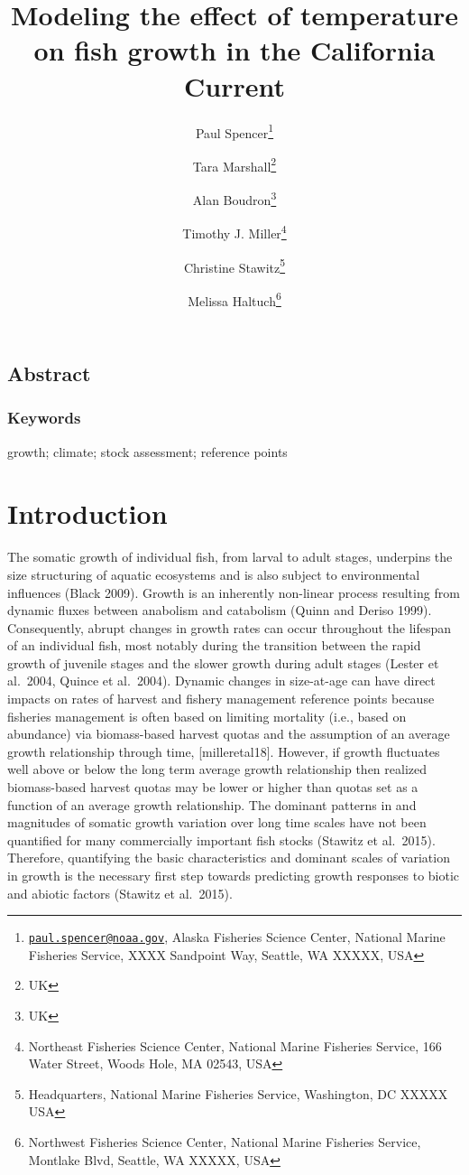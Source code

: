 \documentclass[]{article}
\title{Modeling the effect of temperature on fish growth in the California
Current}
\author{Paul Spencer\footnote{\href{mailto:paul.spencer@noaa.gov}{\nolinkurl{paul.spencer@noaa.gov}},
  Alaska Fisheries Science Center, National Marine Fisheries Service,
  XXXX Sandpoint Way, Seattle, WA XXXXX, USA} \and Tara Marshall\footnote{UK} \and Alan Boudron\footnote{UK} \and Timothy J. Miller\footnote{Northeast Fisheries Science Center, National
  Marine Fisheries Service, 166 Water Street, Woods Hole, MA 02543, USA} \and Christine Stawitz\footnote{Headquarters, National Marine Fisheries
  Service, Washington, DC XXXXX USA} \and Melissa Haltuch\footnote{Northwest Fisheries Science Center, National
  Marine Fisheries Service, Montlake Blvd, Seattle, WA XXXXX, USA}}
\date{}
\begin{document}
\maketitle

\pagebreak

\hypertarget{abstract}{%
\subsection*{Abstract}\label{abstract}}

\hypertarget{keywords}{%
\subsubsection*{Keywords}\label{keywords}}

growth; climate; stock assessment; reference points

\pagebreak

\hypertarget{introduction}{%
\section{Introduction}\label{introduction}}

The somatic growth of individual fish, from larval to adult stages,
underpins the size structuring of aquatic ecosystems and is also subject
to environmental influences (Black 2009). Growth is an inherently
non-linear process resulting from dynamic fluxes between anabolism and
catabolism (Quinn and Deriso 1999). Consequently, abrupt changes in
growth rates can occur throughout the lifespan of an individual fish,
most notably during the transition between the rapid growth of juvenile
stages and the slower growth during adult stages (Lester et al.~2004,
Quince et al.~2004). Dynamic changes in size-at-age can have direct
impacts on rates of harvest and fishery management reference points
because fisheries management is often based on limiting mortality (i.e.,
based on abundance) via biomass-based harvest quotas and the assumption
of an average growth relationship through time, {[}milleretal18{]}.
However, if growth fluctuates well above or below the long term average
growth relationship then realized biomass-based harvest quotas may be
lower or higher than quotas set as a function of an average growth
relationship. The dominant patterns in and magnitudes of somatic growth
variation over long time scales have not been quantified for many
commercially important fish stocks (Stawitz et al.~2015). Therefore,
quantifying the basic characteristics and dominant scales of variation
in growth is the necessary first step towards predicting growth
responses to biotic and abiotic factors (Stawitz et al.~2015).
\end{document}
